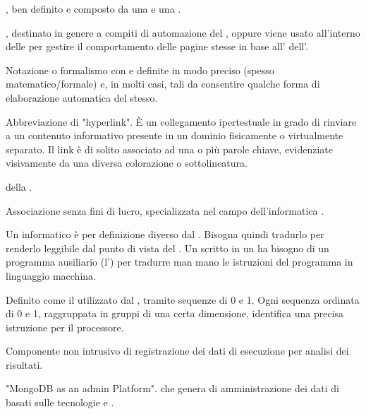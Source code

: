 {, ben definito e composto da una  e una .}

{, destinato in genere a compiti di automazione del , oppure viene usato all'interno delle  per gestire il comportamento delle pagine stesse in base all'  dell'.}

{Notazione o formalismo con  e  definite in modo preciso (spesso matematico/formale) e, in molti casi, tali da consentire qualche forma di elaborazione automatica del  stesso.}

{Abbreviazione di "hyperlink". \`{E} un collegamento ipertestuale in grado di rinviare a un contenuto informativo presente in un dominio fisicamente o virtualmente separato. Il link è di solito associato ad una o più parole chiave, evidenziate visivamente da una diversa colorazione o sottolineatura.}

{ della .}

{Associazione senza fini di lucro, specializzata nel campo dell'informatica .}

{Un  informatico è per definizione diverso dal . Bisogna quindi tradurlo per renderlo leggibile dal punto di vista del . Un  scritto in un  ha bisogno di un programma ausiliario (l') per tradurre man mano le istruzioni del programma in linguaggio macchina.}

{Definito come il  utilizzato dal , tramite sequenze di 0 e 1. Ogni sequenza ordinata di 0 e 1, raggruppata in gruppi di una certa dimensione, identifica una precisa istruzione per il processore.}

{Componente non intrusivo di registrazione dei dati di esecuzione per analisi dei risultati.}




{"MongoDB as an admin Platform".  che genera   di amministrazione dei dati di  basati sulle tecnologie e .}

